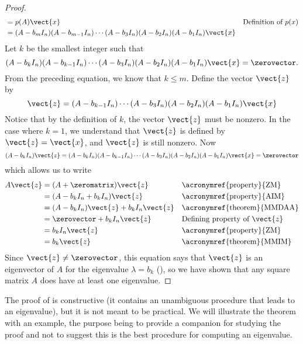 \begin{proof}
\begin{align*}
&=p(A)\vect{x}&&\text{Definition of $p(x)$}\\
&=(A-b_mI_n)(A-b_{m-1}I_n)\cdots(A-b_3I_n)(A-b_2I_n)(A-b_1I_n)\vect{x}
\end{align*}
%
Let $k$ be the smallest integer such that
%
\begin{equation*}
(A-b_kI_n)(A-b_{k-1}I_n)\cdots(A-b_3I_n)(A-b_2I_n)(A-b_1I_n)\vect{x}=\zerovector.
\end{equation*}
%
From the preceding equation, we know that $k\leq m$.  Define the vector $\vect{z}$ by
%
\begin{equation*}
\vect{z}=(A-b_{k-1}I_n)\cdots(A-b_3I_n)(A-b_2I_n)(A-b_1I_n)\vect{x}
\end{equation*}
%
Notice that by the definition of $k$, the vector $\vect{z}$ must be nonzero.  In the case where $k=1$, we understand that $\vect{z}$ is defined by $\vect{z}=\vect{x}$, and $\vect{z}$ is still nonzero.  Now
%
\begin{equation*}
(A-b_kI_n)\vect{z}=(A-b_kI_n)(A-b_{k-1}I_n)\cdots(A-b_3I_n)(A-b_2I_n)(A-b_1I_n)\vect{x}=\zerovector
\end{equation*}
%
which allows us to write
%
\begin{align*}
A\vect{z}
&=(A+\zeromatrix)\vect{z}&&\text{\acronymref{property}{ZM}}\\
&=(A-b_kI_n+b_kI_n)\vect{z}&&\text{\acronymref{property}{AIM}}\\
&=(A-b_kI_n)\vect{z}+b_kI_n\vect{z}&&\text{\acronymref{theorem}{MMDAA}}\\
&=\zerovector+b_kI_n\vect{z}&&\text{Defining property of $\vect{z}$}\\
&=b_kI_n\vect{z}&&\text{\acronymref{property}{ZM}}\\
&=b_k\vect{z}&&\text{\acronymref{theorem}{MMIM}}
\end{align*}
%
Since $\vect{z}\neq\zerovector$, this equation says that $\vect{z}$ is an eigenvector of $A$ for the eigenvalue $\lambda=b_k$ (), so we have shown that any square matrix $A$ does have at least one eigenvalue.
%
\end{proof}
%
The proof of  is constructive (it contains an unambiguous procedure that leads to an eigenvalue), but it is not meant to be practical.  We will illustrate the theorem with an example, the purpose being to provide a companion for studying the proof and not to suggest this is the best procedure for computing an eigenvalue.
%
